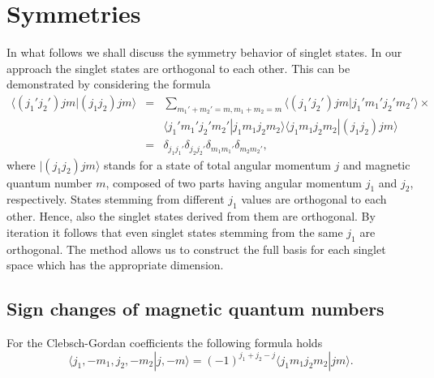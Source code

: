\documentclass[rmp,amsfonts,showpacs,showkeys,preprint]{revtex4}
\begin{document}
\section{Symmetries}

In what follows we shall discuss the symmetry behavior of singlet
states.
In our approach the singlet states are orthogonal to each other.
This can be demonstrated by considering the formula~\cite{Hagedorn}
\begin{equation}
\begin{array}{rcl}
\langle(j_1'j_2')jm|(j_1j_2)jm\rangle &=&\sum_{m_1'+m_2'=m,
m_1+m_2=m}\langle(j_1'j_2')jm|j_1'm_1'j_2'm_2'\rangle\times \\
&&\langle j_1'm_1'j_2'm_2'|j_1m_1j_2m_2\rangle\langle
j_1m_1j_2m_2|(j_1j_2)jm\rangle\\
&=&\delta_{j_1j_1'}\delta_{j_2j_2'}\delta_{m_1m_1'}\delta_{m_2m_2'},
\end{array}
\end{equation}
where $|(j_1j_2)jm\rangle$ stands for a state of total angular momentum $j$ and
magnetic quantum number $m$, composed of two parts having angular momentum $j_1$ and $j_2$, respectively.
States stemming from different
$j_1$ values are orthogonal to each other. Hence, also the singlet
states derived from them are orthogonal. By iteration it follows
that even singlet states stemming from the same $j_1$ are
orthogonal.
The method allows us to construct the full basis for each singlet space
which has the appropriate dimension.


\subsection{Sign changes of magnetic quantum numbers}



For the Clebsch-Gordan coefficients the following formula holds
\begin{equation}
\langle j_1,-m_1,j_2,-m_2|j,-m\rangle
=(-1)^{j_1+j_2-j}\langle j_1m_1j_2m_2|jm\rangle .
\end{equation}
\end{document}
